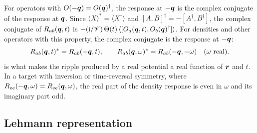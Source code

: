 For operators with $O(-\bm{q}) = O(\bm{q})^\dagger$, the response at $-\bm{q}$ is the complex conjugate of the response at $\bm{q}$. Since $\langle X\rangle^* = \langle X^\dagger\rangle$ and $[A, B]^\dagger = -[A^\dagger, B^\dagger]$, the complex conjugate of $R_{ab}(\bm{q},t)$ is $-(\mathrm{i}/\mathscr{V})\,\Theta(t)\,\langle[O_a(\bm{q},t), O_b(\bm{q})^\dagger]\rangle$. For densities and other operators with this property, the complex conjugate is the response at $-\bm{q}$:
\begin{equation}
  R_{ab}(\bm{q},t)^* = R_{ab}(-\bm{q},t), \qquad R_{ab}(\bm{q},\omega)^* = R_{ab}(-\bm{q},-\omega) \quad (\omega \text{ real}) .
  \label{eq:4.1-reality}
\end{equation}
 is what makes the ripple produced by a real potential a real function of $\bm{r}$ and $t$. In a target with inversion or time-reversal symmetry, where $R_{ee}(-\bm{q},\omega) = R_{ee}(\bm{q},\omega)$, the real part of the density response is even in $\omega$ and its imaginary part odd.

\subsection{Lehmann representation}

